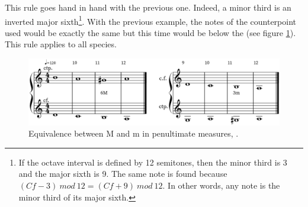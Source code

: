\begin{enumerate}[wide, label=\bfseries 1.H\arabic*]
    This rule goes hand in hand with the previous one. Indeed, a minor third is an inverted major sixth\footnote{If the octave interval is defined by 12 semitones, then the minor third is 3 and the major sixth is 9. The same note is found because $(Cf-3)\ mod\ 12 = (Cf+9)\ mod\ 12$. In other words, any note is the minor third of its major sixth.}. With the previous example, the notes of the counterpoint used would be exactly the same but this time would be below the \cf (see figure \ref{fig:penultnotes1st}). This rule applies to all species.
    \begin{figure}[h]
        \centering
        \includegraphics[height=\fh]{Images/penult_notes.png}
        \caption{Equivalence between M and m in penultimate measures, .}
        \label{fig:penultnotes1st}
    \end{figure}
\end{enumerate}

